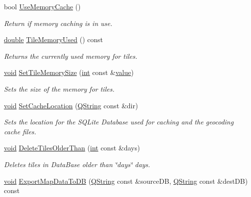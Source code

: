 \begin{DoxyCompactItemize}
bool \hyperlink{group___o_p_map_widget_ga07a1c9decb34a05e0337db285bb15bc3}{Use\-Memory\-Cache} ()
\begin{DoxyCompactList}\small\item\em Return if memory caching is in use. \end{DoxyCompactList}\item 
\hyperlink{_super_l_u_support_8h_a8956b2b9f49bf918deed98379d159ca7}{double} \hyperlink{group___o_p_map_widget_gaf1e79ea822cc04fd7bc6f9b566c19224}{Tile\-Memory\-Used} () const 
\begin{DoxyCompactList}\small\item\em Returns the currently used memory for tiles. \end{DoxyCompactList}\item 
\hyperlink{group___u_a_v_objects_plugin_ga444cf2ff3f0ecbe028adce838d373f5c}{void} \hyperlink{group___o_p_map_widget_gaa6bfe2092080fa7a3464cece122819b5}{Set\-Tile\-Memory\-Size} (\hyperlink{ioapi_8h_a787fa3cf048117ba7123753c1e74fcd6}{int} const \&\hyperlink{glext_8h_aa0e2e9cea7f208d28acda0480144beb0}{value})
\begin{DoxyCompactList}\small\item\em Sets the size of the memory for tiles. \end{DoxyCompactList}\item 
\hyperlink{group___u_a_v_objects_plugin_ga444cf2ff3f0ecbe028adce838d373f5c}{void} \hyperlink{group___o_p_map_widget_ga735443d74919b6c74f91fbf1f0576931}{Set\-Cache\-Location} (\hyperlink{group___u_a_v_objects_plugin_gab9d252f49c333c94a72f97ce3105a32d}{Q\-String} const \&dir)
\begin{DoxyCompactList}\small\item\em Sets the location for the S\-Q\-Lite Database used for caching and the geocoding cache files. \end{DoxyCompactList}\item 
\hyperlink{group___u_a_v_objects_plugin_ga444cf2ff3f0ecbe028adce838d373f5c}{void} \hyperlink{group___o_p_map_widget_ga66137fefcd998b31354b7c0c4575b40a}{Delete\-Tiles\-Older\-Than} (\hyperlink{ioapi_8h_a787fa3cf048117ba7123753c1e74fcd6}{int} const \&days)
\begin{DoxyCompactList}\small\item\em Deletes tiles in Data\-Base older than \char`\"{}days\char`\"{} days. \end{DoxyCompactList}\item 
\hyperlink{group___u_a_v_objects_plugin_ga444cf2ff3f0ecbe028adce838d373f5c}{void} \hyperlink{group___o_p_map_widget_ga373e3935f7b6ce79ca89a7bbfdff8a00}{Export\-Map\-Data\-To\-D\-B} (\hyperlink{group___u_a_v_objects_plugin_gab9d252f49c333c94a72f97ce3105a32d}{Q\-String} const \&source\-D\-B, \hyperlink{group___u_a_v_objects_plugin_gab9d252f49c333c94a72f97ce3105a32d}{Q\-String} const \&dest\-D\-B) const 

\end{DoxyCompactItemize}
